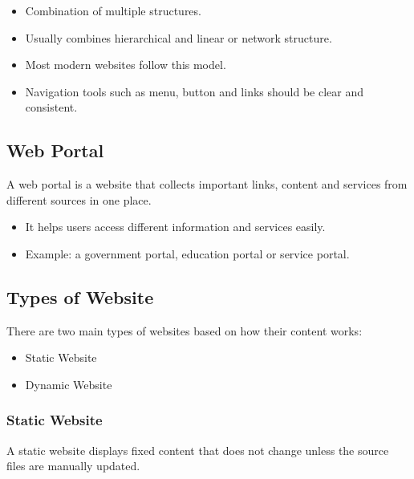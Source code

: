 \begin{itemize}
    \item Combination of multiple structures.
    \item Usually combines hierarchical and linear or network structure.
    \item Most modern websites follow this model.
    \item Navigation tools such as menu, button and links should be clear and consistent.
\end{itemize}


\subsection{Web Portal}

\begin{definitionbox}
A web portal is a website that collects important links, content and services from different sources in one place.
\end{definitionbox}

\begin{itemize}
    \item It helps users access different information and services easily.
    \item Example: a government portal, education portal or service portal.
\end{itemize}


\subsection{Types of Website}

There are two main types of websites based on how their content works:

\begin{itemize}
    \item Static Website
    \item Dynamic Website
\end{itemize}

\subsubsection{Static Website}

\begin{definitionbox}
A static website displays fixed content that does not change unless the source files are manually updated.
\end{definitionbox}

